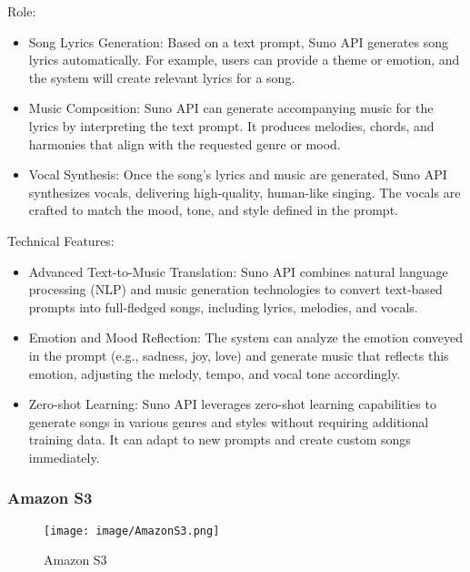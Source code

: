 \documentclass[conference]{IEEEtran}
\begin{document}
Role:
\begin{itemize}
\item Song Lyrics Generation: Based on a text prompt, Suno API generates song lyrics automatically. For example, users can provide a theme or emotion, and the system will create relevant lyrics for a song.\\
\item Music Composition: Suno API can generate accompanying music for the lyrics by interpreting the text prompt. It produces melodies, chords, and harmonies that align with the requested genre or mood.\\
\item Vocal Synthesis: Once the song’s lyrics and music are generated, Suno API synthesizes vocals, delivering high-quality, human-like singing. The vocals are crafted to match the mood, tone, and style defined in the prompt.\\
\end{itemize}

Technical Features:
\begin{itemize}
    \item Advanced Text-to-Music Translation: Suno API combines natural language processing (NLP) and music generation technologies to convert text-based prompts into full-fledged songs, including lyrics, melodies, and vocals.\\
    \item Emotion and Mood Reflection: The system can analyze the emotion conveyed in the prompt (e.g., sadness, joy, love) and generate music that reflects this emotion, adjusting the melody, tempo, and vocal tone accordingly.\\
    \item Zero-shot Learning: Suno API leverages zero-shot learning capabilities to generate songs in various genres and styles without requiring additional training data. It can adapt to new prompts and create custom songs immediately.\\
\end{itemize}


\subsubsection{Amazon S3}

\begin{figure}[h!]
    \centering
    \texttt{[image: image/AmazonS3.png]}
    \caption{Amazon S3}
    \label{fig:enter-label}
\end{figure}
\end{document}

